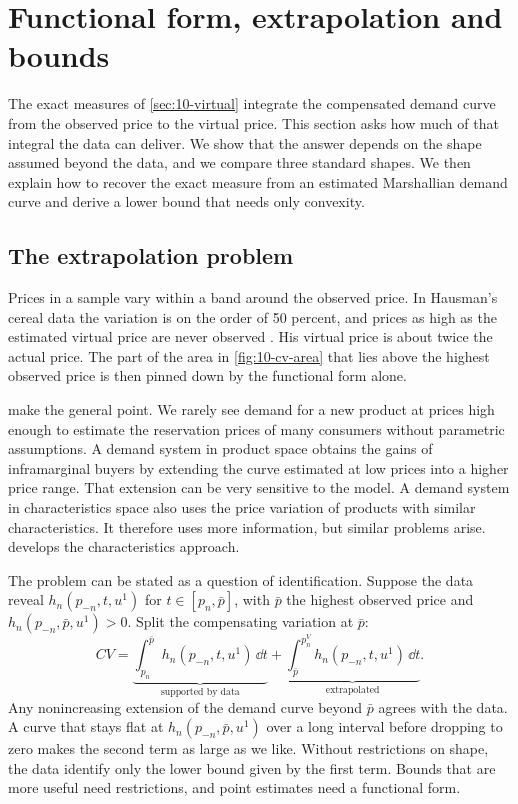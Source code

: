 \section{Functional form, extrapolation and bounds}\label{sec:10-functional}

The exact measures of \cref{sec:10-virtual} integrate the compensated demand curve from the observed price to
the virtual price. This section asks how much of that integral the data can deliver. We show that the answer
depends on the shape assumed beyond the data, and we compare three standard shapes. We then explain how to
recover the exact measure from an estimated Marshallian demand curve and derive a lower bound that needs only
convexity.

\subsection{The extrapolation problem}\label{sec:10-extrapolation}

Prices in a sample vary within a band around the observed price. In Hausman's cereal data the variation is on
the order of 50 percent, and prices as high as the estimated virtual price are never observed
\citep[p.~228]{Hausman1997}. His virtual price is about twice the actual price. The part of the area in
\cref{fig:10-cv-area} that lies above the highest observed price is then pinned down by the functional form
alone.

\citet[Section 1]{BerryPakes2007} make the general point. We rarely see demand for a new product at prices high
enough to estimate the reservation prices of many consumers without parametric assumptions. A demand system in
product space obtains the gains of inframarginal buyers by extending the curve estimated at low prices into a
higher price range. That extension can be very sensitive to the model. A demand system in characteristics
space also uses the price variation of products with similar characteristics. It therefore uses more
information, but similar problems arise.  develops the characteristics approach.

The problem can be stated as a question of identification. Suppose the data reveal $h_n(p_{-n},t,u^1)$ for
$t \in [p_n,\bar p]$, with $\bar p$ the highest observed price and $h_n(p_{-n},\bar p,u^1) > 0$. Split the
compensating variation at $\bar p$:
\begin{equation}\label{eq:10-cv-split}
  CV = \underbrace{\int_{p_n}^{\bar p}h_n(p_{-n},t,u^1)\,\dd t}_{\text{supported by data}}
  + \underbrace{\int_{\bar p}^{p_n^V}h_n(p_{-n},t,u^1)\,\dd t}_{\text{extrapolated}} .
\end{equation}
Any nonincreasing extension of the demand curve beyond $\bar p$ agrees with the data. A curve that stays flat
at $h_n(p_{-n},\bar p,u^1)$ over a long interval before dropping to zero makes the second term as large as we
like. Without restrictions on shape, the data identify only the lower bound given by the first term. Bounds
that are more useful need restrictions, and point estimates need a functional form.

